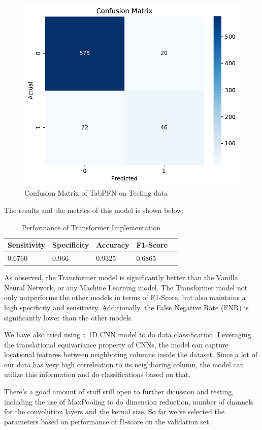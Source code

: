 \documentclass[10pt,letterpaper]{article}
\begin{document}
\begin{figure}[H]
    \centering
    \includegraphics[width=0.5\linewidth]{plots/tabpfn_confusion_matrix.pdf}
    \caption{Confusion Matrix of TabPFN on Testing data}
    \label{fig:confusion-matrix-transformer}
\end{figure}

The results and the metrics of this model is shown below:

\begin{table}[H]
\centering
\footnotesize
\begin{tabular}{lllll}
\toprule
\textbf{Sensitivity} & \textbf{Specificity} & \textbf{Accuracy} &  \textbf{F1-Score}\\
\midrule
0.6760 & 0.966 & 0.9325 & 0.6865  \\
\bottomrule
\end{tabular}
\caption{Performance of Transformer Implementation}%
\end{table}

As observed, the Transformer model is significantly better than the Vanilla Neural Network, or any Machine Learning model.
The Transformer model not only outperforms the other models in terms of F1-Score, but also maintains a high specificity and sensitivity.
Additionally, the False Negative Rate (FNR) is significantly lower than the other models. 

We have also tried using a 1D CNN model to do data classification. Leveraging the translational equivariance property of CNNs, the model can capture locational features between neighboring columns inside the dataset. Since a lot of our data has very high correleation to its neighboring column, the model can utilize this information and do classifications based on that.

There's a good amount of stuff still open to further dicussion and testing, including the use of MaxPooling to do dimension reduction, number of channels for the convolution layers and the kernal size. So far we've selected the parameters based on performance of f1-score on the validation set.
\end{document}
